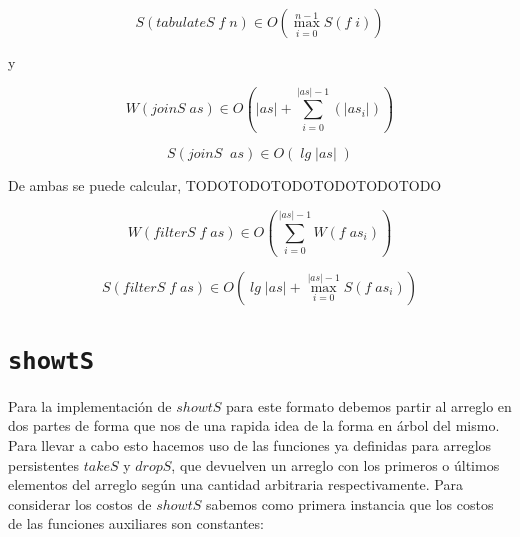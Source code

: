 \documentclass[a4paper,10pt]{article}
\begin{document}
\bigskip

\begin{equation*}
    S \left( tabulateS \;f \;n \right) \in
    O \left( \max_{i=0}^{n-1} S \left( f\; i \right) \right)
\end{equation*}

\smallskip
\begin{center}
y
\end{center}

\begin{equation*}
    W \left(joinS \;as\right) \in
    O \left( \vert as \vert + \sum_{i=0}^{\vert as \vert -1} \left( \vert as_i \vert \right) \right)
\end{equation*}

\begin{equation*}
    S \left(joinS\; \; as \right) \in
    O \left( \;lg \; \vert as \vert \; \right)
\end{equation*}


\bigskip

    De ambas se puede calcular, TODOTODOTODOTODOTODOTODO
 
\begin{equation*}
    W \left(filterS \;f \;as \right) \in
    O \left( \sum_{i=0}^{\vert as \vert -1} W \left( f\; as_i \right) \right)
\end{equation*}

\bigskip

\begin{equation*}
    S \left( filterS \;f \;as \right) \in
    O \left( \;lg \; \vert as \vert + \max_{i=0}^{\vert as \vert -1} S \left( f\; as_i \right) \right)
\end{equation*}


\bigskip


\section*{\texttt{showtS}}

    Para la implementación de $showtS$ para este formato debemos partir al arreglo
en dos partes de forma que nos de una rapida idea de la forma en árbol del mismo.
Para llevar a cabo esto hacemos uso de las funciones ya definidas para arreglos 
persistentes $takeS$ y $dropS$, que devuelven un arreglo con los primeros o últimos
elementos del arreglo según una cantidad arbitraria respectivamente.
    Para considerar los costos de $showtS$ sabemos como primera instancia que los
costos de las funciones auxiliares son constantes:
\end{document}
